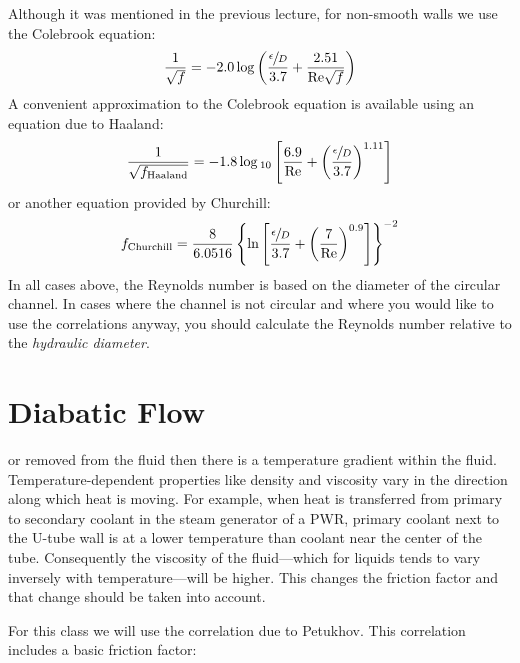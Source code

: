 Although it was mentioned in the previous lecture, for non-smooth walls we use the Colebrook equation:
$$\frac{1}{\sqrt{f}} = -2.0\log{\left(\frac{\sfrac{\epsilon}{D}}{3.7} + \frac{2.51}{\text{Re}\sqrt{f}}\right)}$$
A convenient approximation to the Colebrook equation is available using an equation due to Haaland\cite{haaland1983simple}:
$$ \frac{1}{\sqrt{f_{\text{Haaland}}}}=-1.8 \log{_{10}\left[\frac{6.9}{\text{Re}}+\left(\frac{\sfrac{\epsilon}{D}}{3.7} \right)^{1.11} \right]}$$
or another equation provided by Churchill\cite{churchill1973empirical}:
$$f_{\text{Churchill}}= \frac{8}{6.0516}\left\{\ln{\left[\frac{\sfrac{\epsilon}{D}}{3.7}+\left(\frac{7}{\text{Re}} \right)^{0.9} \right]} \right\}^{-2}$$
In all cases above, the Reynolds number is based on the diameter of the circular channel.  In cases where the channel is not circular and where you would like to use the correlations anyway, you should calculate the Reynolds number relative to the \emph{hydraulic diameter}. 

\section{Diabatic Flow}
 or removed from the fluid then there is a temperature gradient within the fluid.  Temperature-dependent properties like density and viscosity vary in the direction along which heat is moving.  For example, when heat is transferred from primary to secondary coolant in the steam generator of a PWR, primary coolant next to the U-tube wall is at a lower temperature than coolant near the center of the tube.  Consequently the viscosity of the fluid---which for liquids tends to vary inversely with temperature---will be higher.  This changes the friction factor and that change should be taken into account.

For this class we will use the correlation due to Petukhov\cite{petukhov1970heat}. This correlation includes a basic friction factor: 

